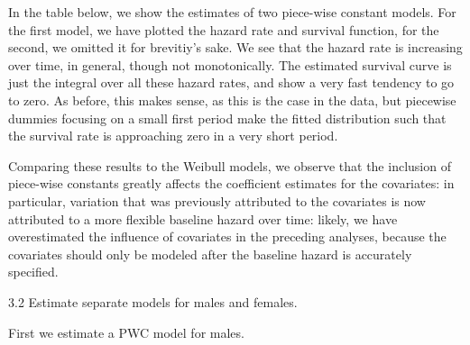 \documentclass[
]{article}
\begin{document}
In the table below, we show the estimates of two piece-wise constant
models. For the first model, we have plotted the hazard rate and
survival function, for the second, we omitted it for brevitiy's sake. We
see that the hazard rate is increasing over time, in general, though not
monotonically. The estimated survival curve is just the integral over
all these hazard rates, and show a very fast tendency to go to zero. As
before, this makes sense, as this is the case in the data, but piecewise
dummies focusing on a small first period make the fitted distribution
such that the survival rate is approaching zero in a very short period.

Comparing these results to the Weibull models, we observe that the
inclusion of piece-wise constants greatly affects the coefficient
estimates for the covariates: in particular, variation that was
previously attributed to the covariates is now attributed to a more
flexible baseline hazard over time: likely, we have overestimated the
influence of covariates in the preceding analyses, because the
covariates should only be modeled after the baseline hazard is
accurately specified.

\clearpage

3.2 Estimate separate models for males and females.

First we estimate a PWC model for males.
\end{document}
